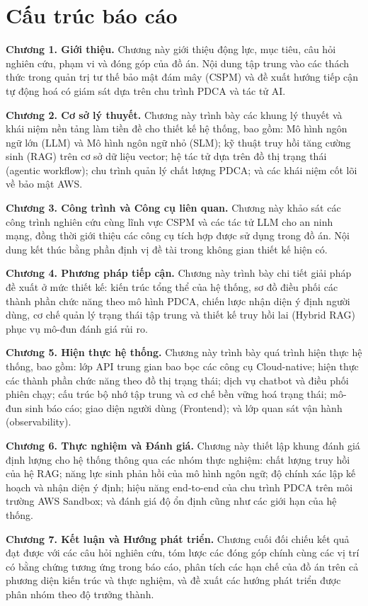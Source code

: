 \section{Cấu trúc báo cáo}

\textbf{Chương 1. Giới thiệu.}
Chương này giới thiệu động lực, mục tiêu, câu hỏi nghiên cứu, phạm vi và đóng góp của đồ án. Nội dung tập trung vào các thách thức trong quản trị tư thế bảo mật đám mây (CSPM) và đề xuất hướng tiếp cận tự động hoá có giám sát dựa trên chu trình PDCA và tác tử AI.

\textbf{Chương 2. Cơ sở lý thuyết.}
Chương này trình bày các khung lý thuyết và khái niệm nền tảng làm tiền đề cho thiết kế hệ thống, bao gồm: Mô hình ngôn ngữ lớn (LLM) và Mô hình ngôn ngữ nhỏ (SLM); kỹ thuật truy hồi tăng cường sinh (RAG) trên cơ sở dữ liệu vector; hệ tác tử dựa trên đồ thị trạng thái (agentic workflow); chu trình quản lý chất lượng PDCA; và các khái niệm cốt lõi về bảo mật AWS.

\textbf{Chương 3. Công trình và Công cụ liên quan.}
Chương này khảo sát các công trình nghiên cứu cùng lĩnh vực CSPM và các tác tử LLM cho an ninh mạng, đồng thời giới thiệu các công cụ tích hợp được sử dụng trong đồ án. Nội dung kết thúc bằng phần định vị đề tài trong không gian thiết kế hiện có.

\textbf{Chương 4. Phương pháp tiếp cận.}
Chương này trình bày chi tiết giải pháp đề xuất ở mức thiết kế: kiến trúc tổng thể của hệ thống, sơ đồ điều phối các thành phần chức năng theo mô hình PDCA, chiến lược nhận diện ý định người dùng, cơ chế quản lý trạng thái tập trung và thiết kế truy hồi lai (Hybrid RAG) phục vụ mô-đun đánh giá rủi ro.

\textbf{Chương 5. Hiện thực hệ thống.}
Chương này trình bày quá trình hiện thực hệ thống, bao gồm: lớp API trung gian bao bọc các công cụ Cloud-native; hiện thực các thành phần chức năng theo đồ thị trạng thái; dịch vụ chatbot và điều phối phiên chạy; cấu trúc bộ nhớ tập trung và cơ chế bền vững hoá trạng thái; mô-đun sinh báo cáo; giao diện người dùng (Frontend); và lớp quan sát vận hành (observability).

\textbf{Chương 6. Thực nghiệm và Đánh giá.}
Chương này thiết lập khung đánh giá định lượng cho hệ thống thông qua các nhóm thực nghiệm: chất lượng truy hồi của hệ RAG; năng lực sinh phản hồi của mô hình ngôn ngữ; độ chính xác lập kế hoạch và nhận diện ý định; hiệu năng end-to-end của chu trình PDCA trên môi trường AWS Sandbox; và đánh giá độ ổn định cũng như các giới hạn của hệ thống.

\textbf{Chương 7. Kết luận và Hướng phát triển.}
Chương cuối đối chiếu kết quả đạt được với các câu hỏi nghiên cứu, tóm lược các đóng góp chính cùng các vị trí có bằng chứng tương ứng trong báo cáo, phân tích các hạn chế của đồ án trên cả phương diện kiến trúc và thực nghiệm, và đề xuất các hướng phát triển được phân nhóm theo độ trưởng thành.
